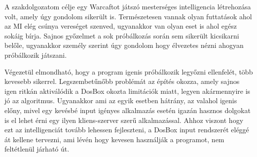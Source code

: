 
A szakdolgozatom célje egy Warcaftot játszó mesterséges intelligencia létrehozása volt, amely úgy gondolom sikerült is. Természetesen vannak olyan futtatások ahol az MI elég csúnya vereséget szenved, ugyanakkor van olyan eset is ahol egész sokáig bírja. Sajnos győzelmet a sok próbálkozás során sem sikerült kicsikarni belőle, ugyanakkor személy szerint úgy gondolom hogy élvezetes nézni ahogyan próbálkozik játszani. 

Végezetül elmondható, hogy a program igenis próbálkozik legyőzni ellenfelét, több kevesebb sikerrel. Legszembetűnőbb problémát az építés okozza, amely sajnos igen ritkán aktiválódik a DosBox okozta limitációk miatt, legyen akármennyire is jó az algoritmus. Ugyanakkor ami az egyik esetben hátrány, az valahol igenis előny, mivel egy kevésbé input igényes alkalmazás esetén igazán hasznos dolgokat is el lehet érni egy ilyen kliens-szerver szerű alkalmazással.
Ahhoz viszont hogy ezt az intelligenciát tovább lehessen fejleszteni, a DosBox input rendszerét eléggé át kellene tervezni, ami lévén hogy kevesen használják a programot, nem feltétlenül járható út.